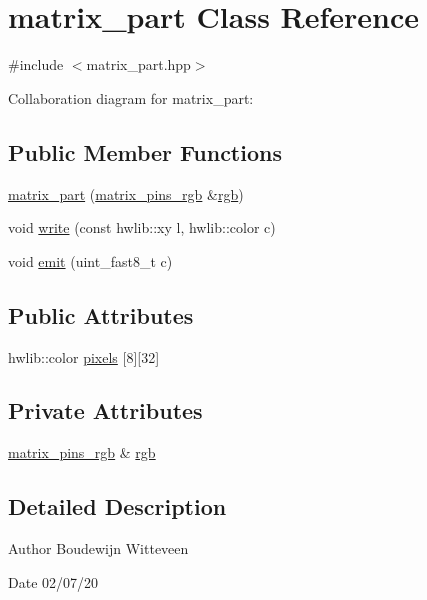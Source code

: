 \hypertarget{classmatrix__part}{}\section{matrix\+\_\+part Class Reference}
\label{classmatrix__part}


{\ttfamily \#include $<$matrix\+\_\+part.\+hpp$>$}



Collaboration diagram for matrix\+\_\+part\+:
\subsection*{Public Member Functions}
\begin{DoxyCompactItemize}
\item 
\hyperlink{classmatrix__part_add901206be9433d77e2b12a7fd5b67ad}{matrix\+\_\+part} (\hyperlink{classmatrix__pins__rgb}{matrix\+\_\+pins\+\_\+rgb} \&\hyperlink{classmatrix__part_a45da93a3e56a7cd58afb246f960d0bf2}{rgb})
\item 
void \hyperlink{classmatrix__part_a2a218481c377245fbf5fbd74c9cf467e}{write} (const hwlib\+::xy l, hwlib\+::color c)
\item 
void \hyperlink{classmatrix__part_ae4c419aa81e5895dde34bfecaccd7eba}{emit} (uint\+\_\+fast8\+\_\+t c)
\end{DoxyCompactItemize}
\subsection*{Public Attributes}
\begin{DoxyCompactItemize}
\item 
hwlib\+::color \hyperlink{classmatrix__part_a7835744cd69247b16070d6292eced407}{pixels} \mbox{[}8\mbox{]}\mbox{[}32\mbox{]}
\end{DoxyCompactItemize}
\subsection*{Private Attributes}
\begin{DoxyCompactItemize}
\item 
\hyperlink{classmatrix__pins__rgb}{matrix\+\_\+pins\+\_\+rgb} \& \hyperlink{classmatrix__part_a45da93a3e56a7cd58afb246f960d0bf2}{rgb}
\end{DoxyCompactItemize}


\subsection{Detailed Description}
\begin{DoxyAuthor}{Author}
Boudewijn Witteveen 
\end{DoxyAuthor}
\begin{DoxyDate}{Date}
02/07/20 
\end{DoxyDate}


